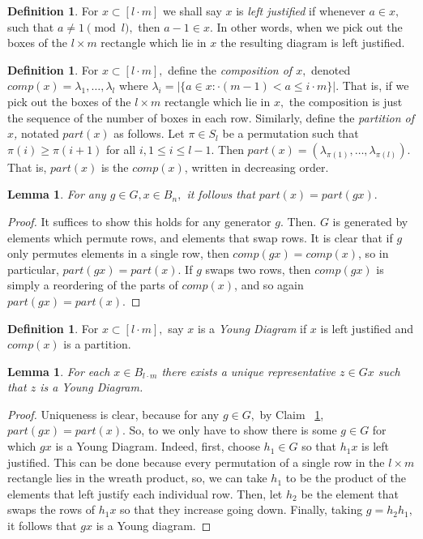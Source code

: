 \documentclass[10 pt]{amsart}
\theoremstyle{plain}
\newtheorem{lem}[thm]{Lemma}
\theoremstyle{definition}
\newtheorem{defn}[thm]{Definition}
\theoremstyle{remark}
\numberwithin{equation}{section}
\begin{document}
\begin{defn}
For $x \subset [l \cdot m]$ we shall say $x$ is {\it left justified} if whenever $a \in x,$ such that $a \neq 1 \pmod l,$ then $a -1 \in x.$ In other words, when we pick out the boxes of the $l\times m$ rectangle which lie in $x$ the resulting diagram is left justified.
\end{defn}

\begin{defn}
For $x \subset [l\cdot m],$ define the {\it composition of $x,$} denoted $comp(x) = \lambda_1 ,\ldots, \lambda_l$ where $\lambda_i = |\{a \in x\colon\cdot (m-1)< a \leq i \cdot m\}|.$ That is, if we pick out the boxes of the $l \times m$ rectangle which lie in $x,$ the composition is just the sequence of the number of boxes in each row. Similarly, define the {\it partition of $x$,} notated $part(x)$ as follows. Let $\pi \in S_l$ be a permutation such that $\pi(i) \geq \pi(i+1)$ for all $i,1\leq i \leq l-1.$ Then  $part(x) = (\lambda_{\pi(1)},\ldots, \lambda_{\pi(l)}).$ That is, $part(x)$ is the $comp(x)$, written in decreasing order.
\end{defn}

\begin{lem}
\label{lem:comp_invariance}
For any $g \in G, x \in B_n,$ it follows that $part(x) = part(gx).$
\end{lem}
\begin{proof}
It suffices to show this holds for any generator $g.$ Then. $G$ is generated by elements which permute rows, and elements that swap rows. It is clear that if $g$ only permutes elements in a single row, then $comp(gx) = comp(x)$, so in particular, $part(gx) = part(x).$ If $g$ swaps two rows, then $comp(gx)$ is simply a reordering of the parts of $comp(x)$, and so again $part(gx) = part(x).$
\end{proof}

\begin{defn}
For $x \subset [l\cdot m],$ say $x$ is a {\it Young Diagram} if $x$ is left justified and $comp(x)$ is a partition.
\end{defn}

\begin{lem}
\label{lem:young_diag_reps}
For each $x \in B_{l\cdot m}$ there exists a unique representative $z \in Gx$ such that $z$ is a Young Diagram.
\end{lem}
\begin{proof}
Uniqueness is clear, because for any $g \in G,$ by Claim ~\ref{lem:comp_invariance}, $part(gx) = part(x).$ So, to we only have to show there is some $g \in G$ for which $gx$ is a Young Diagram. Indeed, first, choose $h_1 \in G$ so that $h_1x$ is left justified. This can be done because every permutation of a single row in the $l\times m$ rectangle lies in the wreath product, so, we can take $h_1$ to be the product of the elements that left justify each individual row. Then, let $h_2$ be the element that swaps the rows of $h_1x$ so that they increase going down. Finally, taking $g = h_2 h_1,$ it follows that $gx$ is a Young diagram. 
\end{proof}
\end{document}
